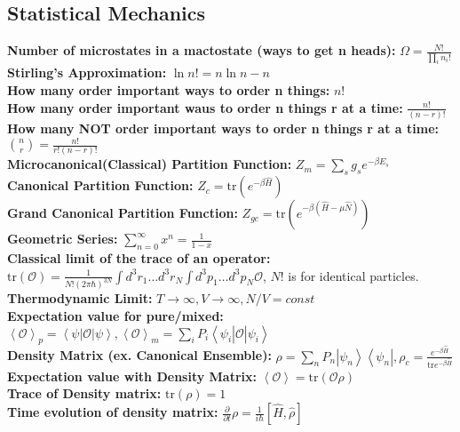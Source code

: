 \documentclass[12pt]{extarticle}
\newcommand{\ket}[1]{\left| #1 \right>}
\newcommand{\bra}[1]{\left< #1 \right|}
\begin{document}
\subsection{Statistical Mechanics}
\textbf{Number of microstates in a mactostate (ways to get n heads):} $\Omega = \frac{N!}{\prod_i n_i!}$ \\
\textbf{Stirling's Approximation:} $\ln n! = n\ln n - n$ \\
\textbf{How many order important ways to order n things:} $n!$ \\
\textbf{How many order important waus to order n things r at a time:} $\frac{n!}{(n-r)!}$ \\
\textbf{How many NOT order important ways to order n things r at a time:} $\binom{n}{r} = \frac{n!}{r!(n-r)!}$ \\
\textbf{Microcanonical(Classical) Partition Function:} $Z_m = \sum_s g_s e^{-\beta E_s}$ \\
\textbf{Canonical Partition Function:} $Z_c = \mathrm{tr}\left( e^{-\beta \hat{H}} \right)$ \\
\textbf{Grand Canonical Partition Function:} $Z_{gc} = \mathrm{tr}\left( e^{-\beta (\hat{H}-\mu\hat{N})} \right)$ \\
\textbf{Geometric Series:} $\sum\limits_{n=0}^\infty x^n = \frac{1}{1-x}$ \\
\textbf{Classical limit of the trace of an operator:} $\mathrm{tr}(\mathcal{O}) = \frac{1}{N!(2\pi\hbar)^{3N}} \int d^3r_1 \ldots d^3r_N \int d^3p_1 \ldots d^3p_N \mathcal{O}$, $N!$ is for identical particles. \\
\textbf{Thermodynamic Limit:} $T \rightarrow \infty, V \rightarrow \infty, N/V = const$ \\
\textbf{Expectation value for pure/mixed:} $\left<\mathcal{O}\right>_p = \bra{\psi}\mathcal{O}\ket{\psi}, \left<\mathcal{O}\right>_m = \sum_i P_i \bra{\psi_i}\mathcal{O}\ket{\psi_i}$ \\
\textbf{Density Matrix (ex. Canonical Ensemble):} $\rho = \sum_n P_n \ket{\psi_n}\bra{\psi_n}, \rho_{c} = \frac{e^{-\beta \hat{H}}}{\mathrm{tr}e^{-\beta\hat{H}}}$ \\
\textbf{Expectation value with Density Matrix:} $\left<\mathcal{O}\right> = \mathrm{tr}(\mathcal{O} \rho)$ \\
\textbf{Trace of Density matrix:} $\mathrm{tr}(\rho) = 1$ \\
\textbf{Time evolution of density matrix:} $\frac{\partial}{\partial t} \rho = \frac{1}{i\hbar}\left[\hat{H},\hat{\rho}\right]$ \\
\end{document}
